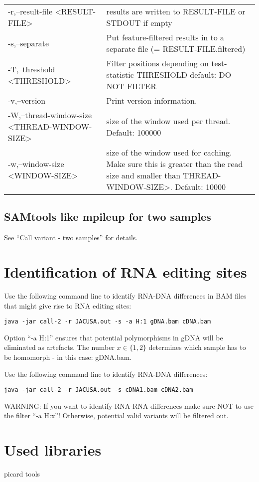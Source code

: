 \documentclass[10pt, a4paper]{article}
\begin{document}
\begin{center}
{\begin{longtable}{p{}p{}}
 -r,--result-file <RESULT-FILE>                 & results are written to RESULT-FILE or STDOUT if empty \\
 -s,--separate                                  & Put feature-filtered results in to a separate file (= RESULT-FILE.filtered)\\
 -T,--threshold <THRESHOLD>                     & Filter positions depending on test-statistic THRESHOLD default: DO NOT FILTER \\
 -v,--version                                   & Print version information. \\
 -W,--thread-window-size <THREAD-WINDOW-SIZE>   & size of the window used per thread. Default: 100000 \\
 -w,--window-size <WINDOW-SIZE>                 & size of the window used for caching. Make sure this is greater than the read size and smaller than THREAD-WINDOW-SIZE>. Default:
 10000
\end{longtable}}
\end{center}
\subsection{SAMtools like mpileup for two samples}
See ``Call variant - two samples'' for details.
\section{Identification of RNA editing sites}
Use the following command line to identify RNA-DNA differences in BAM files that might give rise to RNA editing sites:
\begin{verbatim}
java -jar call-2 -r JACUSA.out -s -a H:1 gDNA.bam cDNA.bam
\end{verbatim}
Option ``-a H:1'' ensures that potential polymorphisms in gDNA will be eliminated as artefacts. The number $x \in \{1, 2\}$
determines which sample has to be homomorph - in this case: gDNA.bam.

Use the following command line to identify RNA-DNA differences:
\begin{verbatim}
java -jar call-2 -r JACUSA.out -s cDNA1.bam cDNA2.bam
\end{verbatim}
WARNING: If you want to identify RNA-RNA differences make sure NOT to use the filter ``-a H:x''! Otherwise, potential valid variants will be filtered out. 

\section{Used libraries}
picard tools
\end{document}
